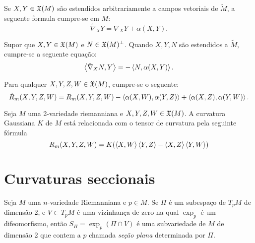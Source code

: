 \begin{teorema}
	Se $X,Y \in \mathfrak{X}(M)$ são estendidos arbitrariamente a campos vetoriais de $\tilde{M}$, a seguente formula cumpre-se em $M$:
	\begin{equation*}
		\tilde{\nabla}_X Y = \nabla_X Y + \alpha(X,Y).
	\end{equation*}
\end{teorema}

\begin{lema}
	Supor que $X,Y \in \mathfrak{X}(M)$ e $N \in \mathfrak{X}(M)^\perp$. Quando $X,Y,N$ são estendidos a $\tilde{M}$, cumpre-se a seguente equação:
	\begin{equation*}
		\left\langle \tilde{\nabla}_X N,Y \right\rangle = -\left\langle N,\alpha(X,Y) \right\rangle.
	\end{equation*}
\end{lema}

\begin{teorema}\label{equacao-de-gauss}
	Para qualquer $X,Y,Z,W \in \mathfrak{X}(M)$, cumpre-se o seguente:
	\begin{equation*}
		\tilde{R}_m(X,Y,Z,W) = R_m(X,Y,Z,W) - \left\langle \alpha(X,W),\alpha(Y,Z) \right\rangle + \left\langle \alpha(X,Z),\alpha(Y,W) \right\rangle.
	\end{equation*}
\end{teorema}

\begin{proposicao}\label{relacion-tensor-de-curvatura-con-la-curvatura-gaussiana}
	Seja $M$ uma 2-variedade riemanniana e
	$X,Y,Z,W \in \mathfrak{X}(M)$.
	A curvatura Gaussiana $K$ de $M$ está relacionada com o tensor de curvatura pela seguinte fórmula
	\begin{equation*}
		R_m(X,Y,Z,W) = K (\left\langle X,W \right\rangle \left\langle Y,Z \right\rangle - \left\langle X,Z \right\rangle \left\langle Y,W \right\rangle)
	\end{equation*}
\end{proposicao}

\section{Curvaturas seccionais}

\begin{definicao}
	Seja $M$ uma $n$-variedade Riemanniana e $p \in M$. Se $\Pi$ é um subespaço de $T_p M$ de dimensão 2, e $V \subset T_p M$ é uma vizinhança de zero  na qual $\exp_p$ é um difeomorfismo, então $S_{\Pi} = \exp_p(\Pi \cap V)$ é uma subvariedade de $M$ de dimensão 2 que contem a  $p$ chamada \emph{seção plana} determinada por $\Pi$.
\end{definicao}

